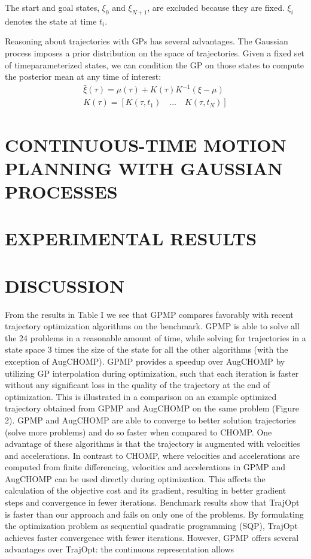 \documentclass{IEEEtran}
\begin{document}
The start and goal states, $\xi_0$ and $\xi_{N+1}$, are excluded because
they are fixed. $\xi_i$ denotes the state at time $t_i$.

Reasoning about trajectories with GPs has several advantages. The Gaussian process imposes a prior distribution
on the space of trajectories. Given a fixed set of timeparameterized states, we can condition the GP on those states
to compute the posterior mean at any time of interest:
\begin{gather}
\bar{\xi}(\tau)=\mu(\tau)+K(\tau)K^{-1}(\xi-\mu)\\
K(\tau)=[K(\tau,t_1) \quad... \quad K(\tau,t_N)]
\end{gather}

\section{CONTINUOUS-TIME MOTION PLANNING WITH GAUSSIAN PROCESSES}
\section{EXPERIMENTAL RESULTS}
\section{DISCUSSION}
From the results in Table I we see that GPMP compares
favorably with recent trajectory optimization algorithms on
the benchmark. GPMP is able to solve all the 24 problems in
a reasonable amount of time, while solving for trajectories in
a state space 3 times the size of the state for all the other algorithms (with the exception of AugCHOMP). GPMP provides
a speedup over AugCHOMP by utilizing GP interpolation
during optimization, such that each iteration is faster without
any significant loss in the quality of the trajectory at the
end of optimization. This is illustrated in a comparison on
an example optimized trajectory obtained from GPMP and
AugCHOMP on the same problem (Figure 2).
GPMP and AugCHOMP are able to converge to better
solution trajectories (solve more problems) and do so faster
when compared to CHOMP. One advantage of these algorithms is that the trajectory is augmented with velocities and
accelerations. In contrast to CHOMP, where velocities and
accelerations are computed from finite differencing, velocities and accelerations in GPMP and AugCHOMP can be used
directly during optimization. This affects the calculation of
the objective cost and its gradient, resulting in better gradient
steps and convergence in fewer iterations.
Benchmark results show that TrajOpt is faster than our
approach and fails on only one of the problems. By formulating the optimization problem as sequential quadratic
programming (SQP), TrajOpt achieves faster convergence
with fewer iterations. However, GPMP offers several advantages over TrajOpt: the continuous representation allows
\end{document}
